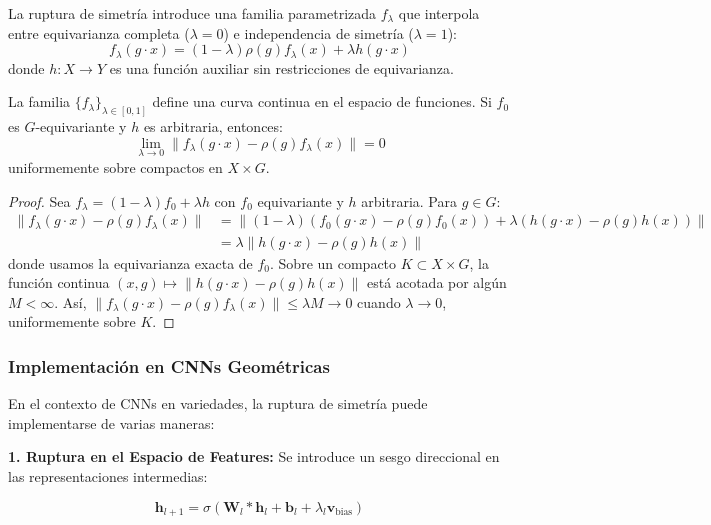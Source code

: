La ruptura de simetría introduce una familia parametrizada $f_\lambda$ que interpola entre equivarianza completa ($\lambda = 0$) e independencia de simetría ($\lambda = 1$):
\begin{equation}
f_\lambda(g \cdot x) = (1-\lambda) \rho(g) f_\lambda(x) + \lambda h(g \cdot x)
\end{equation}
donde $h: X \to Y$ es una función auxiliar sin restricciones de equivarianza.

\begin{proposition}
La familia $\{f_\lambda\}_{\lambda \in [0,1]}$ define una curva continua en el espacio de funciones. Si $f_0$ es $G$-equivariante y $h$ es arbitraria, entonces:
\begin{equation}
\lim_{\lambda \to 0} \|f_\lambda(g \cdot x) - \rho(g) f_\lambda(x)\| = 0
\end{equation}
uniformemente sobre compactos en $X \times G$.
\end{proposition}

\begin{proof}
Sea $f_\lambda = (1-\lambda) f_0 + \lambda h$ con $f_0$ equivariante y $h$ arbitraria. Para $g \in G$:
\begin{align}
\|f_\lambda(g \cdot x) - \rho(g) f_\lambda(x)\| &= \|(1-\lambda)(f_0(g \cdot x) - \rho(g) f_0(x)) + \lambda(h(g \cdot x) - \rho(g) h(x))\| \\
&= \lambda \|h(g \cdot x) - \rho(g) h(x)\|
\end{align}
donde usamos la equivarianza exacta de $f_0$. Sobre un compacto $K \subset X \times G$, la función continua $(x,g) \mapsto \|h(g \cdot x) - \rho(g) h(x)\|$ está acotada por algún $M < \infty$. Así, $\|f_\lambda(g \cdot x) - \rho(g) f_\lambda(x)\| \leq \lambda M \to 0$ cuando $\lambda \to 0$, uniformemente sobre $K$.
\end{proof}

\subsubsection{Implementación en CNNs Geométricas}

En el contexto de CNNs en variedades, la ruptura de simetría puede implementarse de varias maneras:

\textbf{1. Ruptura en el Espacio de Features:} Se introduce un sesgo direccional en las representaciones intermedias:

\begin{equation}
\mathbf{h}_{l+1} = \sigma(\mathbf{W}_l * \mathbf{h}_l + \mathbf{b}_l + \lambda_l \mathbf{v}_{\text{bias}})
\end{equation}


